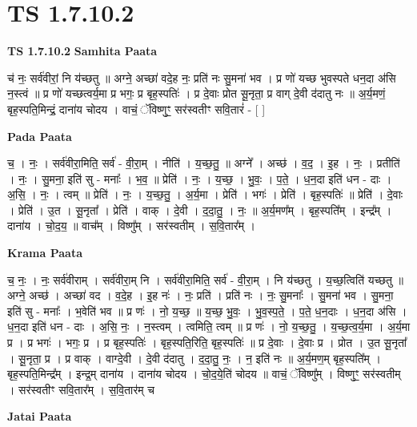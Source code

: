 \documentclass[17pt]{extarticle}
\begin{document}
\section{ TS 1.7.10.2 }

\textbf{TS 1.7.10.2 } \newline
\textbf{Samhita Paata} \newline

च॑ नः॒ सर्व॑वीरां॒ नि य॑च्छतु ॥ अग्ने॒ अच्छा॑ वदे॒ह नः॒ प्रति॑ नः सु॒मना॑ भव । प्र णो॑ यच्छ भुवस्पते धन॒दा अ॑सि न॒स्त्वं ॥ प्र णो॑ यच्छत्वर्य॒मा प्र भगः॒ प्र बृह॒स्पतिः॑ । प्र दे॒वाः प्रोत सू॒नृता॒ प्र वाग् दे॒वी द॑दातु नः ॥ अ॒र्य॒मणं॒ बृह॒स्पति॒मिन्द्रं॒ दाना॑य चोदय । वाचं॒ ॅविष्णुꣳ॒॒ सर॑स्वतीꣳ सवि॒तारं॑ - [ ] \newline

\textbf{Pada Paata} \newline

च॒ । नः॒ । सर्व॑वीरा॒मिति॒ सर्व॑ - वी॒रा॒म् । नीति॑ । य॒च्छ॒तु॒ ॥ अग्ने᳚ । अच्छ॑ । व॒द॒ । इ॒ह । नः॒ । प्रतीति॑ । नः॒ । सु॒मना॒ इति॑ सु - मनाः᳚ । भ॒व॒ ॥ प्रेति॑ । नः॒ । य॒च्छ॒ । भु॒वः॒ । प॒ते॒ । ध॒न॒दा इति॑ धन - दाः । अ॒सि॒ । नः॒ । त्वम् ॥ प्रेति॑ । नः॒ । य॒च्छ॒तु॒ । अ॒र्य॒मा । प्रेति॑ । भगः॑ । प्रेति॑ । बृह॒स्पतिः॑ ॥ प्रेति॑ । दे॒वाः । प्रेति॑ । उ॒त । सू॒नृता᳚ । प्रेति॑ । वाक् । दे॒वी । द॒दा॒तु॒ । नः॒ ॥ अ॒र्य॒मण᳚म् । बृह॒स्पति᳚म् । इन्द्र᳚म् । दाना॑य । चो॒द॒य॒ ॥ वाच᳚म् । विष्णु᳚म् । सर॑स्वतीम् । स॒वि॒तार᳚म् ।  \newline


\textbf{Krama Paata} \newline

च॒ नः॒ । नः॒ सर्व॑वीराम् । सर्व॑वीरा॒म् नि । सर्व॑वीरा॒मिति॒ सर्व॑ - वी॒रा॒म् । नि य॑च्छतु । य॒च्छ॒त्विति॑ यच्छतु ॥ अग्ने॒ अच्छ॑ । अच्छा॑ वद । व॒दे॒ह । इ॒ह नः॑ । नः॒ प्रति॑ । प्रति॑ नः । नः॒ सु॒मनाः᳚ । सु॒मना॑ भव । सु॒मना॒ इति॑ सु - मनाः᳚ । भ॒वेति॑ भव ॥ प्र णः॑ । नो॒ य॒च्छ॒ ॥ य॒च्छ॒ भु॒वः॒ । भु॒व॒स्प॒ते॒ । प॒ते॒ ध॒न॒दाः । ध॒न॒दा अ॑सि । ध॒न॒दा इति॑ धन - दाः । अ॒सि॒ नः॒ । न॒स्त्वम् । त्वमिति॒ त्वम् ॥ प्र णः॑ । नो॒ य॒च्छ॒तु॒ । य॒च्छ॒त्व॒र्य॒मा । अ॒र्य॒मा प्र । प्र भगः॑ । भगः॒ प्र । प्र बृह॒स्पतिः॑ । बृह॒स्पति॒रिति॒ बृह॒स्पतिः॑ ॥ प्र दे॒वाः । दे॒वाः प्र । प्रोत । उ॒त सू॒नृता᳚ । सू॒नृता॒ प्र । प्र वाक् । वाग्दे॒वी । दे॒वी द॑दातु । द॒दा॒तु॒ नः॒ । न॒ इति॑ नः ॥ अ॒र्य॒मण॒म् बृह॒स्पति᳚म् । बृह॒स्पति॒मिन्द्र᳚म् । इन्द्र॒म् दाना॑य । दाना॑य चोदय । चो॒द॒ये॒ति॑ चोदय ॥ वाचं॒ ॅविष्णु᳚म् । विष्णुꣳ॒॒ सर॑स्वतीम् । सर॑स्वतीꣳ सवि॒तार᳚म् । स॒वि॒तार॑म् च \newline

\textbf{Jatai Paata} \newline
\end{document}
